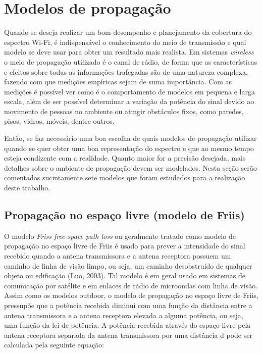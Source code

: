 \documentclass[
	12pt,				%
	openright,			%
	twoside,			%
	a4paper,			%
	english,			%
	french,				%
	spanish,			%
	brazil				%
	]{abntex2}
\begin{document}
\section[Modelos de propagação]{Modelos de propagação}

Quando se deseja realizar um bom desempenho e planejamento da cobertura do espectro Wi-Fi, é indispensável o conhecimento do meio de transmissão e qual modelo se deve usar para obter um resultado mais realista. Em sistemas \textit{wireless} o meio de propagação utilizado é o canal de rádio, de forma que as características e efeitos sobre todas as informações trafegadas são de uma natureza complexa, fazendo com que medições empíricas sejam de suma importância. Com as medições é possível ver como é o comportamento de modelos em pequena e larga escala, além de ser possível determinar a variação da potência do sinal devido ao movimento de pessoas no ambiente ou atingir obstáculos fixos, como paredes, pisos, vidros, móveis, dentre outros.

Então, se faz necessário uma boa escolha de quais modelos de propagação utilizar quando se quer obter uma boa representação do espectro e que ao mesmo tempo esteja condizente com a realidade. Quanto maior for a precisão desejada, mais detalhes sobre o ambiente de propagação devem ser modelados. Nesta seção serão comentados sucintamente sete modelos que foram estudados para a realização deste trabalho.


\subsection[Propagação no espaço livre (modelo de Friis)]{Propagação no espaço livre (modelo de Friis)}

O modelo \textit{Friss free-space path loss} ou geralmente tratado como modelo de propagação no espaço livre de Friis é usado para prever a intensidade do sinal recebido quando a antena transmissora e a antena receptora possuem um caminho de linha de visão limpo, ou seja, um caminho desobstruído de qualquer objeto ou edificação (Luo, 2003). Tal modelo é em geral usado em sistemas de comunicação por satélite e em enlaces de rádio de microondas com linha de visão. Assim como os modelos outdoor, o modelo de propagação no espaço livre de Friis, pressupõe que a potência recebida diminui com uma função da distância entre a antena transmissora e a antena receptora elevada a alguma potência, ou seja, uma função da lei de potência. A potência recebida através do espaço livre pela antena receptora separada da antena transmissora por uma distância d pode ser calculada pela seguinte equação:
\end{document}
